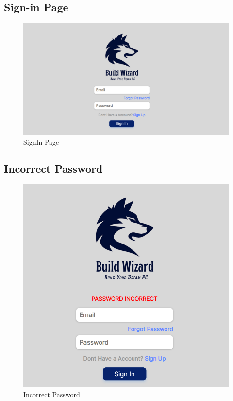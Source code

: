 \subsection{Sign-in Page}
\begin{figure}[H]
    \includegraphics[width=16cm]{Diagrams/UILOGIN.png}
    \caption{SignIn Page}
    \end{figure}
    \subsection{Incorrect Password}
    \begin{figure}[H]
        \includegraphics[width=15cm]{Diagrams/incorrect password.png}
        \caption{Incorrect Password}
        \end{figure}
